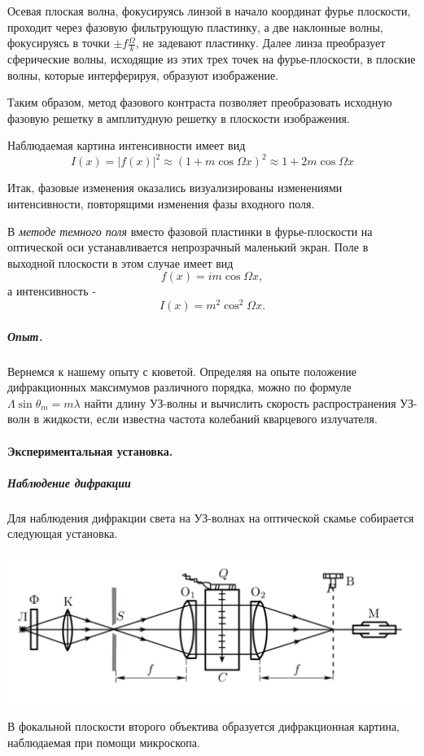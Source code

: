\documentclass[12pt]{article}
\begin{document}
		 Осевая плоская волна, фокусируясь линзой в начало координат фурье плоскости, проходит через фазовую фильтрующую пластинку, а две наклонные волны, фокусируясь в точки $\pm f\frac{\Omega}{k}$, не задевают пластинку. Далее линза преобразует сферические волны, исходящие из этих трех точек на фурье-плоскости, в плоские волны, которые интерферируя, образуют изображение.
		 
		 Таким образом, метод фазового контраста позволяет преобразовать исходную фазовую решетку в амплитудную решетку в плоскости изображения.
		 
		 Наблюдаемая картина интенсивности имеет вид
		 $$I(x)  = |f(x)|^2 \approx (1 + m\cos\Omega x)^2 \approx 1 + 2m\cos\Omega x$$
		 
		  Итак, фазовые изменения оказались визуализированы изменениями интенсивности, повторящими изменения фазы входного поля.
		  
		  В \textit{методе темного поля} вместо фазовой пластинки в фурье-плоскости на оптической оси устанавливается непрозрачный маленький экран. Поле в выходной плоскости в этом случае имеет вид
		  $$f(x) = im\cos\Omega x,$$
		  а интенсивность - $$I(x) = m^2\cos^2\Omega x.$$
		  
		  \subparagraph{Опыт.}
		  Вернемся к нашему опыту с кюветой.
		  Определяя на опыте положение дифракционных максимумов различного порядка, можно по формуле $\Lambda\sin\theta_m = m\lambda$ найти длину УЗ-волны и вычислить скорость распространения УЗ-волн в жидкости, если известна частота колебаний кварцевого излучателя.
		  
		  \paragraph{Экспериментальная установка.}
		   \subparagraph{Наблюдение дифракции}
		  Для наблюдения дифракции света на УЗ-волнах на оптической скамье собирается следующая установка.
		  \begin{center}
		  	
		 
	  \includegraphics[scale=.7]{first}
\end{center}
		В фокальной плоскости второго объектива образуется дифракционная картина, наблюдаемая при помощи микроскопа. 
		
\end{document}
